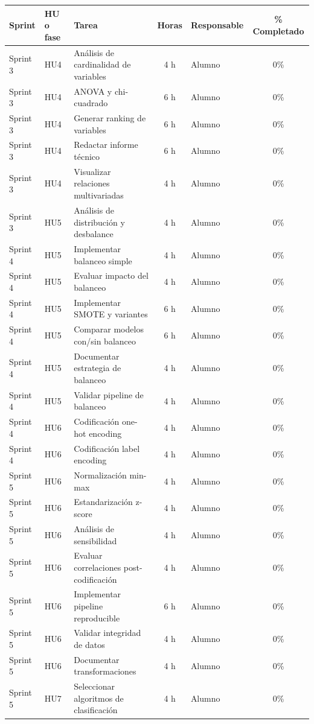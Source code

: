 \documentclass[
11pt, %
]{charter}
\begin{document}
\begin{table}[htpb]
\centering
\begin{tabularx}{\linewidth}{@{}|l|l|X|c|l|c|@{}}
\hline
\rowcolor[HTML]{C0C0C0}
Sprint & HU o fase & Tarea & Horas & Responsable & \% Completado \\ \hline

Sprint 3 & HU4 & Análisis de cardinalidad de variables & 4 h & Alumno & 0\% \\ \hline
Sprint 3 & HU4 & ANOVA y chi-cuadrado & 6 h & Alumno & 0\% \\ \hline
Sprint 3 & HU4 & Generar ranking de variables & 6 h & Alumno & 0\% \\ \hline
Sprint 3 & HU4 & Redactar informe técnico & 6 h & Alumno & 0\% \\ \hline
Sprint 3 & HU4 & Visualizar relaciones multivariadas & 4 h & Alumno & 0\% \\ \hline
Sprint 3 & HU5 & Análisis de distribución y desbalance & 4 h & Alumno & 0\% \\ \hline

Sprint 4 & HU5 & Implementar balanceo simple & 4 h & Alumno & 0\% \\ \hline
Sprint 4 & HU5 & Evaluar impacto del balanceo & 4 h & Alumno & 0\% \\ \hline
Sprint 4 & HU5 & Implementar SMOTE y variantes & 6 h & Alumno & 0\% \\ \hline
Sprint 4 & HU5 & Comparar modelos con/sin balanceo & 6 h & Alumno & 0\% \\ \hline
Sprint 4 & HU5 & Documentar estrategia de balanceo & 4 h & Alumno & 0\% \\ \hline
Sprint 4 & HU5 & Validar pipeline de balanceo & 4 h & Alumno & 0\% \\ \hline
Sprint 4 & HU6 & Codificación one-hot encoding & 4 h & Alumno & 0\% \\ \hline
Sprint 4 & HU6 & Codificación label encoding & 4 h & Alumno & 0\% \\ \hline

Sprint 5 & HU6 & Normalización min-max & 4 h & Alumno & 0\% \\ \hline
Sprint 5 & HU6 & Estandarización z-score & 4 h & Alumno & 0\% \\ \hline
Sprint 5 & HU6 & Análisis de sensibilidad & 4 h & Alumno & 0\% \\ \hline
Sprint 5 & HU6 & Evaluar correlaciones post-codificación & 4 h & Alumno & 0\% \\ \hline
Sprint 5 & HU6 & Implementar pipeline reproducible & 6 h & Alumno & 0\% \\ \hline
Sprint 5 & HU6 & Validar integridad de datos & 4 h & Alumno & 0\% \\ \hline
Sprint 5 & HU6 & Documentar transformaciones & 4 h & Alumno & 0\% \\ \hline
Sprint 5 & HU7 & Seleccionar algoritmos de clasificación & 4 h & Alumno & 0\% \\ \hline


\end{tabularx}
\end{table}
\end{document}
